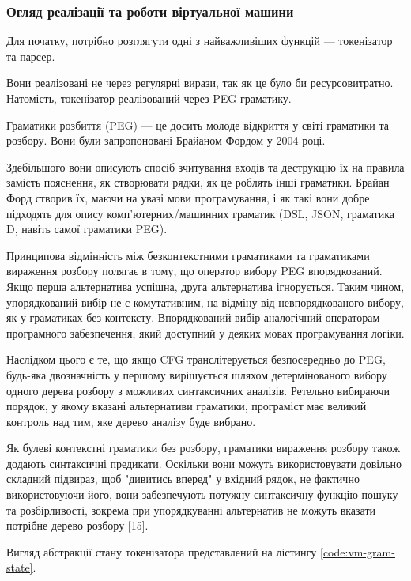 \documentclass{lib/styles/default-style}
\begin{document}
    \subsubsection{Огляд реалізації та роботи віртуальної машини}

    Для початку, потрібно розглягути одні з найважливіших функцій --- токенізатор та парсер.

    Вони реалізовані не через регулярні вирази, так як це було би ресурсовитратно.
    Натомість, токенізатор реалізований через PEG граматику.

    Граматики розбиття (PEG) --- це досить молоде відкриття у світі граматики та розбору.
    Вони були запропоновані Брайаном Фордом у 2004 році.

    Здебільшого вони описують спосіб зчитування входів та
    деструкцію їх на правила замість пояснення,
    як створювати рядки, як це роблять інші граматики.
    Брайан Форд створив їх, маючи на увазі мови програмування,
    і як такі вони добре підходять для опису комп'ютерних/машинних граматик (DSL, JSON, граматика D, навіть самої граматики PEG).

    Принципова відмінність між безконтекстними граматиками та граматиками вираження розбору
    полягає в тому, що оператор вибору PEG впорядкований.
    Якщо перша альтернатива успішна, друга альтернатива ігнорується.
    Таким чином, упорядкований вибір не є комутативним,
    на відміну від невпорядкованого вибору, як у граматиках без контексту.
    Впорядкований вибір аналогічний операторам програмного забезпечення, який доступний у деяких мовах програмування логіки.

    Наслідком цього є те, що якщо CFG транслітерується безпосередньо до
    PEG, будь-яка двозначність у першому вирішується шляхом детермінованого вибору одного
    дерева розбору з можливих синтаксичних аналізів.
    Ретельно вибираючи порядок, у якому вказані альтернативи
    граматики, програміст має великий контроль над тим, яке дерево аналізу буде вибрано.

    Як булеві контекстні граматики без розбору, граматики вираження розбору
    також додають синтаксичні предикати. Оскільки вони можуть використовувати довільно складний підвираз,
    щоб "дивитись вперед" у вхідний рядок, не фактично використовуючи його,
    вони забезпечують потужну синтаксичну функцію пошуку та розбірливості,
    зокрема при упорядкуванні альтернатив не можуть вказати потрібне дерево розбору [15].

    Вигляд абстракції стану токенізатора представлений на лістингу \ref{code:vm-gram-state}.
\end{document}
